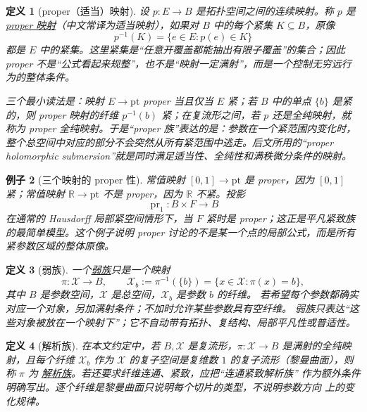 \documentclass[UTF8,fontset=none,a4paper,11pt]{ctexart}
\theoremstyle{foundation-definition}
\newtheorem{definition}{定义}[section]
\theoremstyle{foundation-theorem}
\theoremstyle{foundation-proposition}
\theoremstyle{foundation-example}
\newtheorem{example}[definition]{例子}
\theoremstyle{foundation-remark}
\theoremstyle{foundation-theorem}
\newcommand{\term}[2]{\hyperref[#1]{#2}}
\begin{document}
\begin{definition}[proper（适当）映射]\label{def:proper-map}
设 \(p:E\to B\) 是拓扑空间之间的连续映射。称 \(p\) 是\term{def:proper-map}{proper 映射}（中文常译为适当映射），如果对 \(B\) 中的每个紧集 \(K\subseteq B\)，原像
\[
  p^{-1}(K)=\{e\in E:p(e)\in K\}
\]
都是 \(E\) 中的紧集。这里紧集是“任意开覆盖都能抽出有限子覆盖”的集合；因此 proper 不是“公式看起来规整”，也不是“映射一定满射”，而是一个控制无穷远行为的整体条件。

三个最小读法是：映射 \(E\to\mathrm{pt}\) proper 当且仅当 \(E\) 紧；若 \(B\) 中的单点 \(\{b\}\) 是紧的，则 proper 映射的纤维 \(p^{-1}(b)\) 紧；在复流形之间，若 \(p\) 还是全纯映射，就称为 proper 全纯映射。于是“proper 族”表达的是：参数在一个紧范围内变化时，整个总空间中对应的部分不会突然从所有紧范围中逃走。后文所用的“proper holomorphic submersion”就是同时满足适当性、全纯性和满秩微分条件的映射。
\end{definition}

\begin{example}[三个映射的 proper 性]
常值映射 \([0,1]\to\mathrm{pt}\) 是 proper，因为 \([0,1]\) 紧；常值映射 \(\mathbb R\to\mathrm{pt}\) 不是 proper，因为 \(\mathbb R\) 不紧。投影
\[
  \operatorname{pr}_1:B\times F\to B
\]
在通常的 Hausdorff 局部紧空间情形下，当 \(F\) 紧时是 proper；这正是平凡紧致族的最简单模型。这个例子说明 proper 讨论的不是某一个点的局部公式，而是所有紧参数区域的整体原像。
\end{example}

\begin{definition}[弱族]\label{def:weak-family}
一个\term{def:weak-family}{弱族}只是一个映射
\[
\pi:\mathcal X\to B,\qquad
\mathcal X_b:=\pi^{-1}(\{b\})
  =\{x\in\mathcal X:\pi(x)=b\},
\]
其中 \(B\) 是参数空间，\(\mathcal X\) 是总空间，\(\mathcal X_b\) 是参数 \(b\) 的纤维。
若希望每个参数都确实对应一个对象，另加满射条件；不加时允许某些参数具有空纤维。
弱族只表达“这些对象被放在一个映射下”；它不自动带有拓扑、复结构、局部平凡性或普适性。
\end{definition}

\begin{definition}[解析族]\label{def:analytic-family}
在本文约定中，若 \(B,\mathcal X\) 是复流形，\(\pi:\mathcal X\to B\) 是满射的全纯映射，且每个纤维
\(\mathcal X_b\) 作为 \(\mathcal X\) 的复子空间是复维数 \(1\) 的复子流形（黎曼曲面），则称 \(\pi\) 为
\term{def:analytic-family}{解析族}。若还要求纤维连通、紧致，应把“连通紧致解析族”
作为额外条件明确写出。逐个纤维是黎曼曲面只说明每个切片的类型，不说明参数方向
上的变化规律。
\end{definition}
\end{document}
